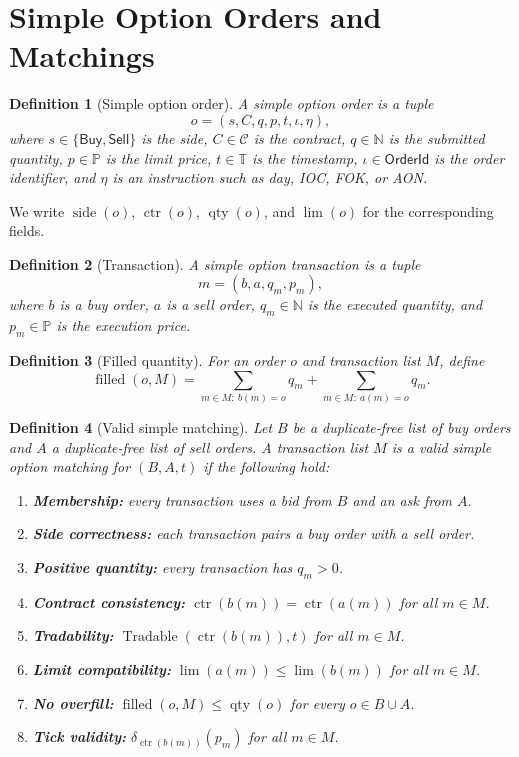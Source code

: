 \documentclass[11pt]{article}
\newtheorem{definition}{Definition}[section]
\newcommand{\Buy}{\mathsf{Buy}}
\newcommand{\Sell}{\mathsf{Sell}}
\newcommand{\Contracts}{\mathcal C}
\newcommand{\Price}{\mathbb P}
\newcommand{\Time}{\mathbb T}
\newcommand{\filled}{\operatorname{filled}}
\newcommand{\contract}{\operatorname{ctr}}
\newcommand{\limitp}{\operatorname{lim}}
\newcommand{\qty}{\operatorname{qty}}
\newcommand{\side}{\operatorname{side}}
\newcommand{\tradable}{\operatorname{Tradable}}
\begin{document}
\section{Simple Option Orders and Matchings}

\begin{definition}[Simple option order]
A simple option order is a tuple
\[
o=(s,C,q,p,t,\iota,\eta),
\]
where \(s\in\{\Buy,\Sell\}\) is the side, \(C\in\Contracts\) is the contract, \(q\in\mathbb N\) is the submitted quantity, \(p\in\Price\) is the limit price, \(t\in\Time\) is the timestamp, \(\iota\in\mathsf{OrderId}\) is the order identifier, and \(\eta\) is an instruction such as day, IOC, FOK, or AON.
\end{definition}

We write \(\side(o)\), \(\contract(o)\), \(\qty(o)\), and \(\limitp(o)\) for the corresponding fields.

\begin{definition}[Transaction]
A simple option transaction is a tuple
\[
m=(b,a,q_m,p_m),
\]
where \(b\) is a buy order, \(a\) is a sell order, \(q_m\in\mathbb N\) is the executed quantity, and \(p_m\in\Price\) is the execution price.
\end{definition}

\begin{definition}[Filled quantity]
For an order \(o\) and transaction list \(M\), define
\[
\filled(o,M)
=
\sum_{m\in M:\ b(m)=o} q_m
+
\sum_{m\in M:\ a(m)=o} q_m.
\]
\end{definition}

\begin{definition}[Valid simple matching]
Let \(B\) be a duplicate-free list of buy orders and \(A\) a duplicate-free list of sell orders. A transaction list \(M\) is a valid simple option matching for \((B,A,t)\) if the following hold:
\begin{enumerate}[label=(M\arabic*)]
  \item \textbf{Membership:} every transaction uses a bid from \(B\) and an ask from \(A\).
  \item \textbf{Side correctness:} each transaction pairs a buy order with a sell order.
  \item \textbf{Positive quantity:} every transaction has \(q_m>0\).
  \item \textbf{Contract consistency:} \(\contract(b(m))=\contract(a(m))\) for all \(m\in M\).
  \item \textbf{Tradability:} \(\tradable(\contract(b(m)),t)\) for all \(m\in M\).
  \item \textbf{Limit compatibility:} \(\limitp(a(m))\le \limitp(b(m))\) for all \(m\in M\).
  \item \textbf{No overfill:} \(\filled(o,M)\le \qty(o)\) for every \(o\in B\cup A\).
  \item \textbf{Tick validity:} \(\delta_{\contract(b(m))}(p_m)\) for all \(m\in M\).
\end{enumerate}
\end{definition}
\end{document}

